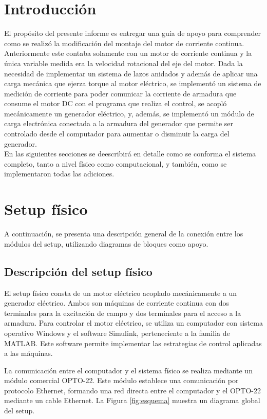 \section{Introducción}

El propósito del presente informe es entregar una guía de apoyo para comprender como se realizó la modificación del montaje del motor de corriente continua. Anteriormente este contaba solamente con un motor de corriente continua y la única variable medida era la velocidad rotacional del eje del motor. Dada la necesidad de implementar un sistema de lazos anidados y además de aplicar una carga mecánica que ejerza torque al motor eléctrico, se implementó un sistema de medición de corriente para poder comunicar la corriente de armadura que consume el motor DC con el programa que realiza el control, se acopló mecánicamente un generador eléctrico, y, además, se implementó un módulo de carga electrónica conectada a la armadura del generador que permite ser controlado desde el computador para aumentar o disminuir la carga del generador.\\

En las siguientes secciones se deescribirá en detalle como se conforma el sistema completo, tanto a nivel físico como computacional, y también, como se implementaron todas las adiciones.\\

\section{Setup físico}

A continuación, se presenta una descripción general de la conexión entre los módulos del setup, utilizando diagramas de bloques como apoyo.

\subsection{Descripción del setup físico}

El setup físico consta de un motor eléctrico acoplado mecánicamente a un generador eléctrico. Ambos son máquinas de corriente continua con dos terminales para la excitación de campo y dos terminales para el acceso a la armadura. Para controlar el motor eléctrico, se utiliza un computador con sistema operativo Windows y el software Simulink, perteneciente a la familia de MATLAB. Este software permite implementar las estrategias de control aplicadas a las máquinas.

La comunicación entre el computador y el sistema físico se realiza mediante un módulo comercial OPTO-22. Este módulo establece una comunicación por protocolo Ethernet, formando una red directa entre el computador y el OPTO-22 mediante un cable Ethernet. La Figura \ref{fig:esquema} muestra un diagrama global del setup.

